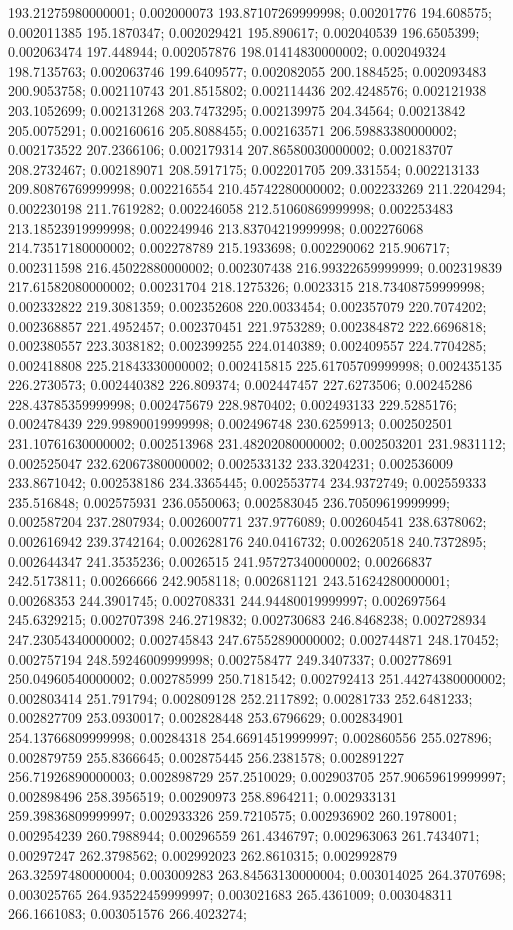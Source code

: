 193.21275980000001; 0.002000073 193.87107269999998; 0.00201776 194.608575; 0.002011385 195.1870347; 0.002029421 195.890617; 0.002040539 196.6505399; 0.002063474 197.448944; 0.002057876 198.01414830000002; 0.002049324 198.7135763; 0.002063746 199.6409577; 0.002082055 200.1884525; 0.002093483 200.9053758; 0.002110743 201.8515802; 0.002114436 202.4248576; 0.002121938 203.1052699; 0.002131268 203.7473295; 0.002139975 204.34564; 0.00213842 205.0075291; 0.002160616 205.8088455; 0.002163571 206.59883380000002; 0.002173522 207.2366106; 0.002179314 207.86580030000002; 0.002183707 208.2732467; 0.002189071 208.5917175; 0.002201705 209.331554; 0.002213133 209.80876769999998; 0.002216554 210.45742280000002; 0.002233269 211.2204294; 0.002230198 211.7619282; 0.002246058 212.51060869999998; 0.002253483 213.18523919999998; 0.002249946 213.83704219999998; 0.002276068 214.73517180000002; 0.002278789 215.1933698; 0.002290062 215.906717; 0.002311598 216.45022880000002; 0.002307438 216.99322659999999; 0.002319839 217.61582080000002; 0.00231704 218.1275326; 0.0023315 218.73408759999998; 0.002332822 219.3081359; 0.002352608 220.0033454; 0.002357079 220.7074202; 0.002368857 221.4952457; 0.002370451 221.9753289; 0.002384872 222.6696818; 0.002380557 223.3038182; 0.002399255 224.0140389; 0.002409557 224.7704285; 0.002418808 225.21843330000002; 0.002415815 225.61705709999998; 0.002435135 226.2730573; 0.002440382 226.809374; 0.002447457 227.6273506; 0.00245286 228.43785359999998; 0.002475679 228.9870402; 0.002493133 229.5285176; 0.002478439 229.99890019999998; 0.002496748 230.6259913; 0.002502501 231.10761630000002; 0.002513968 231.48202080000002; 0.002503201 231.9831112; 0.002525047 232.62067380000002; 0.002533132 233.3204231; 0.002536009 233.8671042; 0.002538186 234.3365445; 0.002553774 234.9372749; 0.002559333 235.516848; 0.002575931 236.0550063; 0.002583045 236.70509619999999; 0.002587204 237.2807934; 0.002600771 237.9776089; 0.002604541 238.6378062; 0.002616942 239.3742164; 0.002628176 240.0416732; 0.002620518 240.7372895; 0.002644347 241.3535236; 0.0026515 241.95727340000002; 0.00266837 242.5173811; 0.00266666 242.9058118; 0.002681121 243.51624280000001; 0.00268353 244.3901745; 0.002708331 244.94480019999997; 0.002697564 245.6329215; 0.002707398 246.2719832; 0.002730683 246.8468238; 0.002728934 247.23054340000002; 0.002745843 247.67552890000002; 0.002744871 248.170452; 0.002757194 248.59246009999998; 0.002758477 249.3407337; 0.002778691 250.04960540000002; 0.002785999 250.7181542; 0.002792413 251.44274380000002; 0.002803414 251.791794; 0.002809128 252.2117892; 0.00281733 252.6481233; 0.002827709 253.0930017; 0.002828448 253.6796629; 0.002834901 254.13766809999998; 0.00284318 254.66914519999997; 0.002860556 255.027896; 0.002879759 255.8366645; 0.002875445 256.2381578; 0.002891227 256.71926890000003; 0.002898729 257.2510029; 0.002903705 257.90659619999997; 0.002898496 258.3956519; 0.00290973 258.8964211; 0.002933131 259.39836809999997; 0.002933326 259.7210575; 0.002936902 260.1978001; 0.002954239 260.7988944; 0.00296559 261.4346797; 0.002963063 261.7434071; 0.00297247 262.3798562; 0.002992023 262.8610315; 0.002992879 263.32597480000004; 0.003009283 263.84563130000004; 0.003014025 264.3707698; 0.003025765 264.93522459999997; 0.003021683 265.4361009; 0.003048311 266.1661083; 0.003051576 266.4023274; 